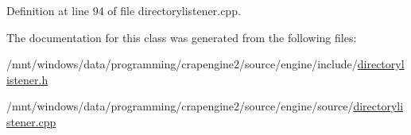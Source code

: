 Definition at line 94 of file directorylistener.\+cpp.



The documentation for this class was generated from the following files\+:\begin{DoxyCompactItemize}
\item 
/mnt/windows/data/programming/crapengine2/source/engine/include/\hyperlink{directorylistener_8h}{directorylistener.\+h}\item 
/mnt/windows/data/programming/crapengine2/source/engine/source/\hyperlink{directorylistener_8cpp}{directorylistener.\+cpp}\end{DoxyCompactItemize}
